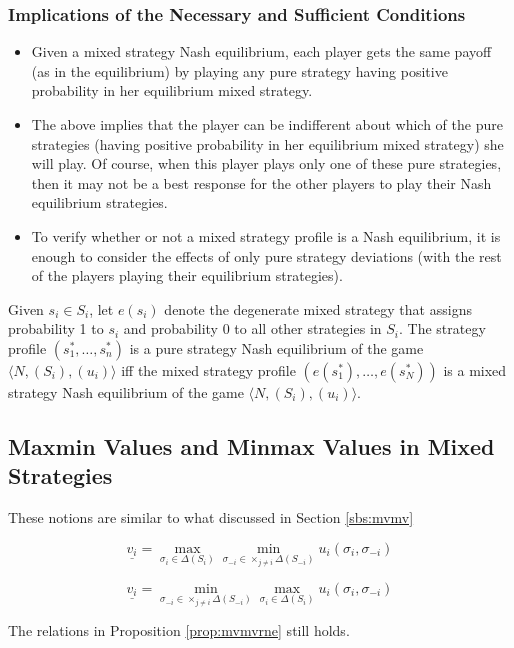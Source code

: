 \subsubsection{Implications of the Necessary and Sufficient Conditions}
\begin{itemize}
	\item Given a mixed strategy Nash equilibrium, each player gets the same payoff (as in the equilibrium) by playing any pure strategy having positive probability in her equilibrium mixed strategy.
	\item The above implies that the player can be indifferent about which of the pure strategies (having positive probability in her equilibrium mixed strategy) she will play.
	Of course, when this player plays only one of these pure strategies, then it may not be a best response for the other players to play their Nash equilibrium strategies.
	\item To verify whether or not a mixed strategy profile is a Nash equilibrium, it is enough to consider the effects of only pure strategy deviations (with the rest of the players playing their equilibrium strategies).
\end{itemize}
\begin{prop}
	Given $s_i \in S_i$, let $e(s_i)$ denote the degenerate mixed strategy that assigns probability 1 to $s_i$ and probability 0 to all other strategies in $S_i$.
	The strategy profile $(s_1^*,\ldots,s_n^*)$ is a pure strategy Nash equilibrium of the game $\langle N,(S_i),(u_i)\rangle$ iff the mixed strategy profile $(e(s_1^*),\ldots,e(s_N^*))$ is a mixed strategy Nash equilibrium of the game $\langle N,(S_i),(u_i)\rangle$.
\end{prop}
\subsection{Maxmin Values and Minmax Values in Mixed Strategies}
These notions are similar to what discussed in Section \ref{sbs:mvmv}
\begin{defn}
	\[\underline{v_i}=\max_{\sigma_i\in \Delta(S_i)} \min_{\sigma_{-i}\in \times_{j\neq i}\Delta(S_{-i})} u_i(\sigma_i,\sigma_{-i})\]
\end{defn}
\begin{defn}
	\[\underline{v_i}=\min_{\sigma_{-i}\in \times_{j\neq i}\Delta(S_{-i})} \max_{\sigma_i\in \Delta(S_i)} u_i(\sigma_i,\sigma_{-i})\]
\end{defn}
The relations in Proposition \ref{prop:mvmvrne} still holds.
